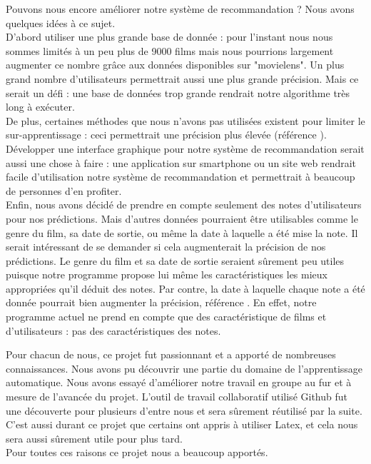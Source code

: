 \documentclass[a4paper,10pt]{article}
\begin{document}
Pouvons nous encore améliorer notre système de recommandation ? Nous avons quelques idées à ce sujet.\\
D'abord utiliser une plus grande base de donnée : pour l'instant nous nous sommes limités à un peu plus de 9000 films mais nous pourrions largement augmenter ce nombre grâce aux données disponibles 
sur "movielens". Un plus grand nombre d'utilisateurs permettrait aussi une plus grande précision. Mais ce serait un défi : une base de données trop grande rendrait notre algorithme très long à exécuter.\\
De plus, certaines méthodes que nous n'avons pas utilisées existent pour limiter le sur-apprentissage : ceci permettrait une précision plus élevée (référence \cite{mooc}).\\
Développer une interface graphique pour notre système de recommandation serait aussi une chose à faire : une application sur smartphone ou un site web rendrait facile d'utilisation notre système de recommandation et permettrait à beaucoup de personnes d'en profiter.\\
Enfin, nous avons décidé de prendre en compte seulement des notes d'utilisateurs pour nos prédictions. Mais d'autres données pourraient être utilisables comme le genre du film, sa date de sortie, ou même la date à laquelle a été mise la note. Il serait intéressant de se demander si cela augmenterait la précision de nos prédictions. Le genre du film et sa date de sortie seraient sûrement peu utiles puisque notre programme propose lui même les caractéristiques les mieux appropriées qu'il déduit des notes. Par contre, la date à laquelle chaque note a été donnée pourrait bien augmenter la précision, référence \cite{matrix}. En effet, notre programme actuel ne prend en compte que des caractéristique de films et d'utilisateurs : pas des caractéristiques des notes.

Pour chacun de nous, ce projet fut passionnant et a apporté de nombreuses connaissances. Nous avons pu découvrir une partie du domaine de l'apprentissage automatique. Nous avons essayé d'améliorer notre travail en groupe au fur et à mesure de l'avancée du projet. L'outil de travail collaboratif utilisé Github fut une découverte pour plusieurs d'entre nous et sera sûrement réutilisé par la suite. C'est aussi durant ce projet que certains ont appris à utiliser Latex, et cela nous sera aussi sûrement utile pour plus tard.\\
Pour toutes ces raisons ce projet nous a beaucoup apportés.

\newpage 
 
\end{document}
